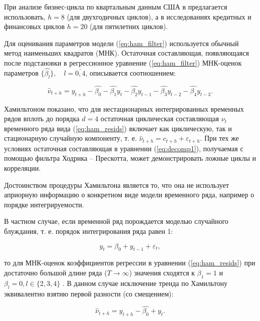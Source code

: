 \documentclass[a4paper,14pt]{extreport}
\begin{document}
	При анализе бизнес-цикла по квартальным данным США в \cite{hamHP} предлагается использовать, $h=8$ (для двухгодичных циклов), а в исследованиях кредитных и финансовых циклов $h=20$ (для пятилетних циклов).
	
	Для оценивания параметров модели (\ref{eq:ham_filter}) используется обычный метод наименьших квадратов (МНК). Остаточная составляющая, появляющаяся после подстановки в регрессионное уравнение (\ref{eq:ham_filter}) МНК-оценок параметров $\{\hat{\beta_l}\}, \quad l=\overline{0,4}$, описывается соотношением:
	
	\begin{equation}
		\hat{\nu}_{t+h} = y_{t+h} - \hat{\beta_0} - \hat{\beta_1} y_t 
		- \hat{\beta_2} y_{t-1} - \hat{\beta_3} y_{t-2} - \hat{\beta_4} y_{t-3} .
		\label{eq:ham_resids}
	\end{equation}	
	
	Хамильтоном показано, что для нестационарных интегрированных временных рядов вплоть до порядка $d=4$ остаточная циклическая составляющая $\nu_t$ временного ряда вида (\ref{eq:ham_resids}) включает как циклическую, так и стационарную случайную компоненту, т. е. $\hat{\nu}_{t+h}=c_{t+h} + \varepsilon_{t+h}$. При тех же условиях остаточная составляющая в уравнении (\ref{eq:decomp1}), получаемая с помощью фильтра Ходрика -- Прескотта, может демонстрировать ложные циклы и корреляции. 
	
	Достоинством процедуры Хамильтона является то, что она не использует априорную информацию о конкретном виде модели временного ряда, например о порядке интегрируемости. 
	
	В частном случае, если временной ряд порождается моделью случайного блуждания, т. е. порядок интегрирования ряда равен 1: 
	
	\begin{equation}
		y_t = \beta_0 + y_{t-1} + \varepsilon_t ,
		\label{eq:ham_unitroot}
	\end{equation}
	
	то для МНК-оценок коэффициентов регрессии в уравнении (\ref{eq:ham_resids}) при достаточно большой длине ряда ($T \rightarrow \infty$) значения сходятся к $\beta_1 = 1$ и $\beta_l = 0, l \in \{2, 3, 4\}$ \cite[с. 16-17]{hamHP}. В данном случае исключение тренда по Хамильтону эквивалентно взятию первой разности (со смещением):
	
	\begin{equation}
		\hat{\nu}_{t+h} = y_{t+h} - \hat{\beta_0} + y_{t} .
		\label{eq:ham_unitroot_resid}
	\end{equation}
	
\end{document}
